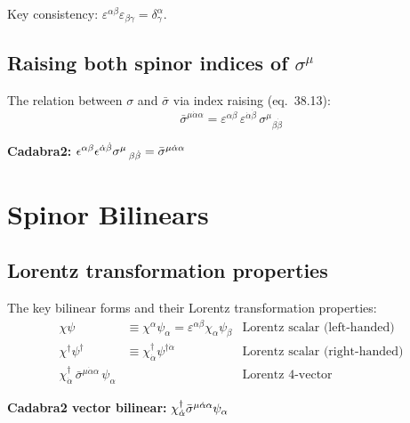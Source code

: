 Key consistency: $\varepsilon^{\alpha\beta}\varepsilon_{\beta\gamma} = \delta^\alpha_\gamma$.

\subsection{Raising both spinor indices of \texorpdfstring{$\sigma^\mu$}{sigma}}

The relation between $\sigma$ and $\bar\sigma$ via index raising (eq.~38.13):
\begin{equation}
  \bar\sigma^{\mu\dot\alpha\alpha}
  = \varepsilon^{\alpha\beta}\,\varepsilon^{\dot\alpha\dot\beta}\,
    \sigma^\mu{}_{\beta\dot\beta}
  \tag{38.13}
\end{equation}

\textbf{Cadabra2:} $\epsilon^{\alpha \beta} \epsilon^{\dot{\alpha} \dot{\beta}} \sigma^{\mu}\,_{\beta \dot{\beta}} = \bar{\sigma}^{\mu \dot{\alpha} \alpha}$


\section{Spinor Bilinears}

\subsection{Lorentz transformation properties}

The key bilinear forms and their Lorentz transformation properties:
\begin{align}
  \chi\psi &\equiv \chi^\alpha\psi_\alpha
  = \varepsilon^{\alpha\beta}\chi_\alpha\psi_\beta
  &\text{Lorentz scalar (left-handed)}
  \tag{38.14a}\\
  \chi^\dagger\psi^\dagger &\equiv \chi^\dagger_{\dot\alpha}\psi^{\dagger\dot\alpha}
  &\text{Lorentz scalar (right-handed)}
  \tag{38.14b}\\
  \chi^\dagger_{\dot\alpha}\,\bar\sigma^{\mu\dot\alpha\alpha}\,\psi_\alpha
  &
  &\text{Lorentz 4-vector}
  \tag{38.14c}
\end{align}

\textbf{Cadabra2 vector bilinear:} $\chi^{\dagger}_{\dot{\alpha}} \bar{\sigma}^{\mu \dot{\alpha} \alpha} \psi_{\alpha}$

